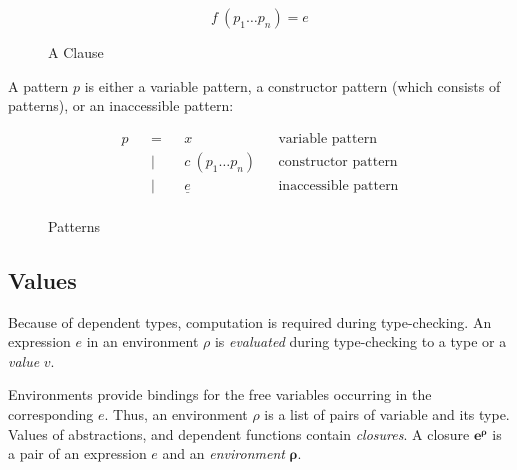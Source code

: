 \begin{figure}[H]
  \begin{equation*}
    f \: (p_1 \dots p_n) = e
  \end{equation*}
  \caption{A Clause}
\end{figure}

A pattern $p$ is either a variable pattern, a constructor pattern (which
consists of patterns), or an inaccessible pattern:

\begin{figure}[H]
  \begin{equation*}
    \begin{aligned}
      p &  & = &  & x                    &  & \textrm{variable pattern}     \\
        &  & | &  & c \: (p_1 \dots p_n) &  & \textrm{constructor pattern}  \\
        &  & | &  & \underline{e}        &  & \textrm{inaccessible pattern} \\
    \end{aligned}
  \end{equation*}
  \caption{Patterns}
\end{figure}

\subsection{Values}

Because of dependent types, computation is required during type-checking. An
expression $e$ in an environment $\rho$ is \emph{evaluated} during type-checking to a type or a \emph{value} $v$.

Environments provide bindings for the free variables occurring in the
corresponding $e$. Thus, an environment $\rho$ is a list of pairs of variable and its type. Values of abstractions, and dependent functions contain \emph{closures}. A closure $\boldsymbol{e^{\rho}}$ is a pair of an expression $e$ and an
\emph{environment} $\boldsymbol{\rho}$.

